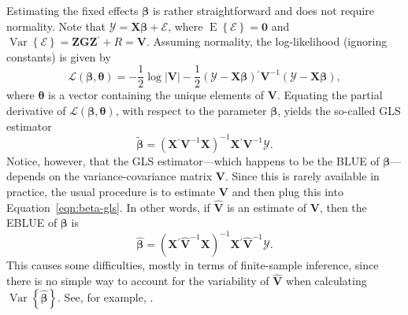 \documentclass[cmfont,usenames,dvipsnames,leqno]{afit-etd}\usepackage[]{graphicx}\usepackage[]{color}
\newcommand{\loglik}{\mathscr{L}}
\newcommand{\trans}{\ensuremath{^\prime}}
\newcommand{\bc}[1]{\ensuremath{\bm{\mathcal{#1}}}}
\newcommand{\mc}[1]{\ensuremath{\mathcal{#1}}}
\newcommand{\wh}[1]{\ensuremath{\widehat{#1}}}
\newcommand{\wt}[1]{\ensuremath{\widetilde{#1}}}
\newcommand{\E}{\operatorname{E}}
\newcommand{\var}{\operatorname{Var}}
\newcommand{\X}{\ensuremath{\bm{X}}}
\newcommand{\Z}{\ensuremath{\bm{Z}}}
\begin{document}
Estimating the fixed effects $\bm{\beta}$ is rather straightforward and does not require normality. Note that $\bc{Y} = \X\bm{\beta} + \bm{\mc{E}}$, where $\E\left\{\bm{\mc{E}}\right\} = \bm{0}$ and $\var\left\{\bm{\mc{E}}\right\} = \Z\bm{G}\Z\trans + R = \bm{V}$. Assuming normality, the log-likelihood (ignoring constants) is given by
\begin{equation}
\label{eqn:lmm-loglik-long}
  \loglik\left(\bm{\beta}, \bm{\theta}\right) = -\frac{1}{2}\log\left|\bm{V}\right| - \frac{1}{2}\left(\bc{Y} - \X\bm{\beta}\right)\trans\bm{V}^{-1}\left(\bc{Y} - \X\bm{\beta}\right),
\end{equation}
where $\bm{\theta}$ is a vector containing the unique elements of $\bm{V}$. Equating the partial derivative of $\loglik\left(\bm{\beta}, \bm{\theta}\right)$, with respect to the parameter $\bm{\beta}$, yields the so-called \ac{GLS} estimator
\begin{equation}
\label{eqn:beta-gls}
  \wt{\bm{\beta}} = \left(\X\trans\bm{V}^{-1}\X\right)^{-1}\X\trans\bm{V}^{-1}\bc{Y}.
\end{equation}
Notice, however, that the \ac{GLS} estimator---which happens to be the \ac{BLUE} of $\bm{\beta}$---depends on the variance-covariance matrix $\bm{V}$. Since this is rarely available in practice, the usual procedure is to estimate $\bm{V}$ and then plug this into Equation~\eqref{eqn:beta-gls}. In other words, if $\widehat{\bm{V}}$ is an estimate of $\bm{V}$, then the \ac{EBLUE} of $\bm{\beta}$ is 
\begin{equation}
\label{eqn:beta-egls}
  \wh{\bm{\beta}} = \left(\X\trans\widehat{\bm{V}}^{-1}\X\right)^{-1}\X\trans\widehat{\bm{V}}^{-1}\bc{Y}.
\end{equation}
This causes some difficulties, mostly in terms of finite-sample inference, since there is no simple way to account for the variability of $\widehat{\bm{V}}$ when calculating $\var\left\{\wh{\bm{\beta}}\right\}$. See, for example, \citet[pp. 165-167]{mcculloch_generalized_2008}.
\end{document}
